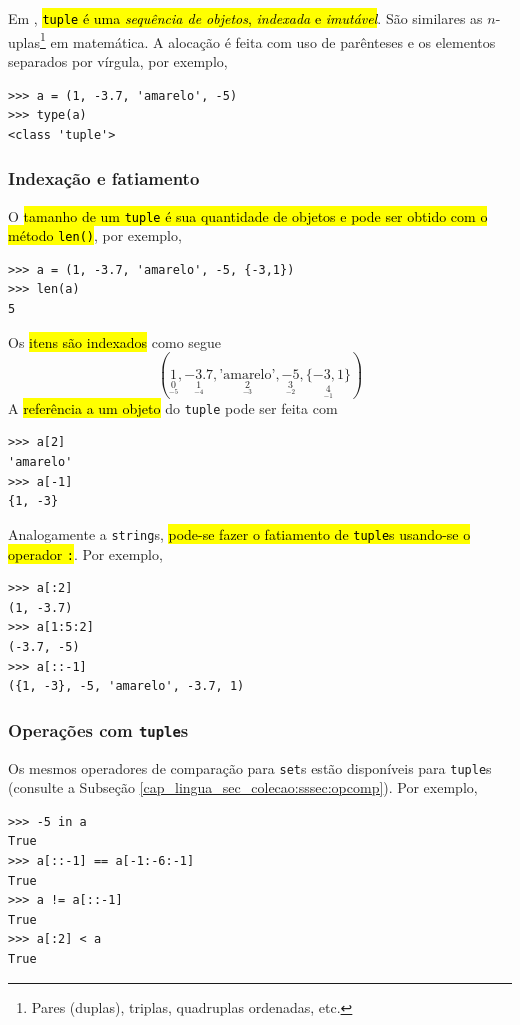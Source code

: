 Em \python, \hl{{\lstinline+tuple+} é uma \emph{sequência de objetos}, \emph{indexada} e \emph{imutável}}. São similares as $n$-uplas\footnote{Pares (duplas), triplas, quadruplas ordenadas, etc.} em matemática. A alocação é feita com uso de parênteses e os elementos separados por vírgula, por exemplo,
\begin{lstlisting}
>>> a = (1, -3.7, 'amarelo', -5)
>>> type(a)
<class 'tuple'>
\end{lstlisting}

\subsubsection{Indexação e fatiamento}

O \hl{tamanho de um {\lstinline+tuple+} é sua quantidade de objetos e pode ser obtido com o método {\lstinline+len()+}}, por exemplo,
\begin{lstlisting}
>>> a = (1, -3.7, 'amarelo', -5, {-3,1})
>>> len(a)
5
\end{lstlisting}
Os \hl{itens são indexados} como segue
\begin{equation}
  (\underset{\underset{-5}{0}}{1}, \underset{\underset{-4}{1}}{-3.7}, \underset{\underset{-3}{2}}{\text{'amarelo'}}, \underset{\underset{-2}{3}}{-5}, \underset{\underset{-1}{4}}{\{-3, 1\}})
\end{equation}
A \hl{referência a um objeto} do \lstinline+tuple+ pode ser feita com
\begin{lstlisting}
>>> a[2]
'amarelo'
>>> a[-1]
{1, -3}
\end{lstlisting}

Analogamente a \lstinline+string+s, \hl{pode-se fazer o fatiamento de {\lstinline+tuple+}s usando-se o operador {\lstinline+:+}}. Por exemplo,
\begin{lstlisting}
>>> a[:2]
(1, -3.7)
>>> a[1:5:2]
(-3.7, -5)
>>> a[::-1]
({1, -3}, -5, 'amarelo', -3.7, 1)
\end{lstlisting}

\subsubsection{Operações com \lstinline+tuple+s}

Os mesmos operadores de comparação para \lstinline+set+s estão disponíveis para \lstinline+tuple+s (consulte a Subseção \ref{cap_lingua_sec_colecao:sssec:opcomp}). Por exemplo,
\begin{lstlisting}
>>> -5 in a
True
>>> a[::-1] == a[-1:-6:-1]
True
>>> a != a[::-1]
True
>>> a[:2] < a
True
\end{lstlisting}

